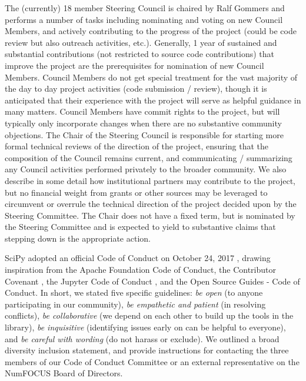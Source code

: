 \documentclass[fleqn,10pt]{wlscirep}
\begin{document}
The (currently) 18 member Steering Council is chaired by Ralf Gommers and
performs a number of tasks including nominating and voting on new Council
Members, and actively contributing to the progress of the project (could be
code review but also outreach activities, etc.). Generally, 1 year of sustained
and substantial contributions (not restricted to source code contributions)
that improve the project are the prerequisites for nomination of new Council
Members. Council Members do not get special treatment for the vast majority of
the day to day project activities (code submission / review), though it is
anticipated that their experience with the project will serve as helpful
guidance in many matters.  Council Members have commit rights to the project,
but will typically only incorporate changes when there are no substantive
community objections. The Chair of the Steering Council is responsible for
starting more formal technical reviews of the direction of the project,
ensuring that the composition of the Council remains current, and communicating
/ summarizing any Council activities performed privately to the broader
community. We also describe in some detail how institutional partners may
contribute to the project, but no financial weight from grants or other sources
may be leveraged to circumvent or overrule the technical direction of the
project decided upon by the Steering Committee. The Chair does not have a fixed
term, but is nominated by the Steering Committee and is expected to yield to
substantive claims that stepping down is the appropriate action.

SciPy adopted an official Code of Conduct on October 24, 2017
\cite{SciPyCodeOfConduct}, drawing inspiration from the Apache Foundation Code
of Conduct\cite{ApacheCodeOfConduct}, the Contributor Covenant
\cite{ContributorConvenant}, the Jupyter Code of Conduct \cite{Jupyter_COC},
and the Open Source Guides - Code of Conduct\cite{OSG_COC}. In short, we stated
five specific guidelines: \emph{be open} (to anyone participating in our
community), \emph{be empathetic and patient} (in resolving conflicts), \emph{be
collaborative} (we depend on each other to build up the tools in the library),
\emph{be inquisitive} (identifying issues early on can be helpful to everyone),
and \emph{be careful with wording} (do not harass or exclude).  We outlined a
broad diversity inclusion statement, and provide instructions for contacting
the three members of our Code of Conduct Committee or an external
representative on the NumFOCUS Board of Directors.
\end{document}
